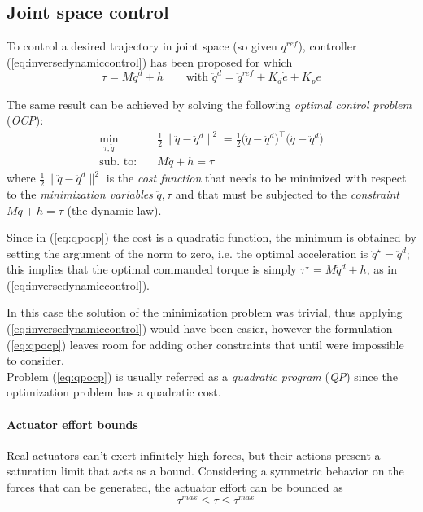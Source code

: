 \subsection{Joint space control}
	To control a desired trajectory in joint space (so given $q^{ref}$), controller (\ref{eq:inversedynamiccontrol}) has been proposed for which
	\[ \tau = M \ddot q^d + h \qquad\textrm{with } \ddot q^d = \ddot q^{ref} + K_d \dot e + K_p e \]
	
	The same result can be achieved by solving the following \textit{optimal control problem} (\textit{OCP}):
	\begin{equation} \label{eq:qpocp}
	\begin{split}
		\min_{\tau, \ddot q}\quad & \frac 1 2 \big\|\ddot q - \ddot q^d \big\|^2 = \frac 1 2 \big(\ddot q - \ddot q^d\big)^\top \big(\ddot q - \ddot q^d\big) \\
		\textrm{sub. to:}\quad & M \ddot q + h = \tau
	\end{split}
	\end{equation}
	where $\frac 1 2 \big\|\ddot q - \ddot q^d \big\|^2$ is the \textit{cost function} that needs to be minimized with respect to the \textit{minimization variables} $\ddot q, \tau$ and that must be subjected to the \textit{constraint} $M\ddot q + h = \tau$ (the dynamic law).
	
	Since in (\ref{eq:qpocp}) the cost is a quadratic function, the minimum is obtained by setting the argument of the norm to zero, i.e. the optimal acceleration is $\ddot q^\star = \ddot q^d$; this implies that the optimal commanded torque is simply $\tau^\star = M \ddot q^d + h$, as in (\ref{eq:inversedynamiccontrol}).
	
	In this case the solution of the minimization problem was trivial, thus applying (\ref{eq:inversedynamiccontrol}) would have been easier, however the formulation (\ref{eq:qpocp}) leaves room for adding other constraints that until were impossible to consider. \\
	Problem (\ref{eq:qpocp}) is usually referred as a \textit{quadratic program} (\textit{QP}) since the optimization problem has a quadratic cost.
	
	\paragraph{Actuator effort bounds} Real actuators can't exert infinitely high forces, but their actions present a saturation limit that acts as a bound. Considering a symmetric behavior on the forces that can be generated, the actuator effort can be bounded as
	\[ -\tau^{max} \leq \tau \leq \tau^{max} \]
	
